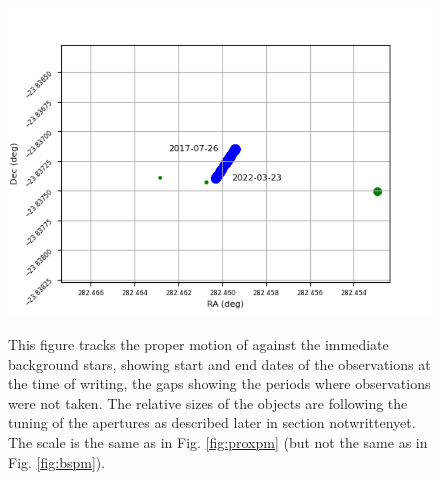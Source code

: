 \begin{figure}[!htbp]
\begin{center}
\includegraphics[scale=0.9]{images/pmross.png} \\
\end{center}   
\caption{This figure tracks the proper motion of {\ross} against the immediate
background stars, showing start and end dates of the observations at the time
of writing, the gaps showing the periods where observations were not taken. The
relative sizes of the objects are following the tuning of the apertures as
described later in section notwrittenyet. The scale is the same as in Fig.
\ref{fig:proxpm} (but not the same as in Fig. \ref{fig:bspm}).}
\protect\label{fig:rosspm}
\end{figure}

\clearpage
